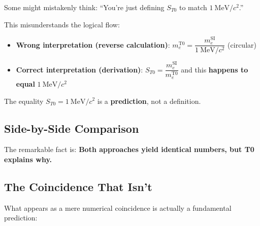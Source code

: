 	Some might mistakenly think: ``You're just defining $S_{T0}$ to match $1~\mathrm{MeV}/c^2$.''
	
	This misunderstands the logical flow:
	
	\begin{itemize}
		\item \textbf{Wrong interpretation (reverse calculation)}: 
		$m_e^{\mathrm{T0}} = \dfrac{m_e^{\mathrm{SI}}}{1~\mathrm{MeV}/c^2}$ (circular)
		
		\item \textbf{Correct interpretation (derivation)}: 
		$S_{T0} = \dfrac{m_e^{\mathrm{SI}}}{m_e^{\mathrm{T0}}}$ and this \textbf{happens to equal} $1~\mathrm{MeV}/c^2$
	\end{itemize}
	
	The equality $S_{T0} = 1~\mathrm{MeV}/c^2$ is a \textbf{prediction}, not a definition.
	
	\subsection{Side-by-Side Comparison}
	
	\begin{table}[h]
		\centering
		\caption{Comparison of conventional vs. T0 interpretation of mass scales}
	\end{table}
	
	The remarkable fact is: \textbf{Both approaches yield identical numbers, but T0 explains why.}
	
	\subsection{The Coincidence That Isn't}
	
	What appears as a mere numerical coincidence is actually a fundamental prediction:
	
